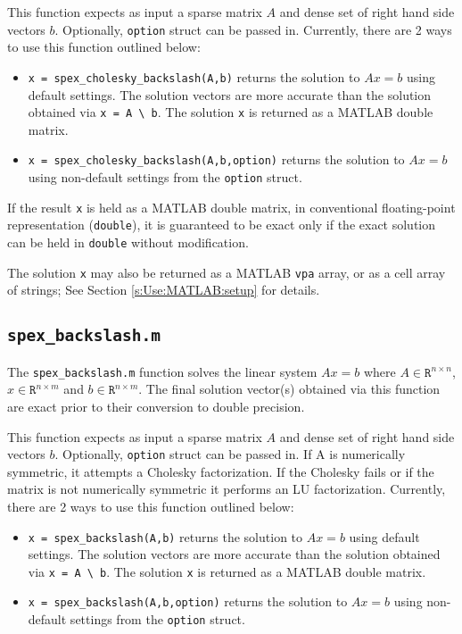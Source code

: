 \documentclass[12pt,oneside]{book}
\theoremstyle{definition}
\begin{document}
This function expects as input a sparse matrix $A$ and dense set of
right hand side vectors $b$. Optionally, \verb|option| struct can be passed in.
Currently, there are 2 ways to use this function outlined below:

\begin{itemize}

\item \verb|x = spex_cholesky_backslash(A,b)| returns the solution to $A x =
b$ using default settings. The solution vectors are more accurate than
the solution obtained via \verb|x = A \ b|.  The solution \verb|x| is
returned as a MATLAB double matrix.

\item \verb|x = spex_cholesky_backslash(A,b,option)| returns the solution to $A x =
b$ using non-default settings from the \verb|option| struct.

\end{itemize}

If the result \verb|x| is held as a MATLAB double matrix, in conventional
floating-point representation (\verb|double|), it is guaranteed to be exact
only if the exact solution can be held in \verb|double| without modification.

The solution \verb|x| may also be returned as a MATLAB \verb|vpa| array, or as
a cell array of strings; See Section \ref{s:Use:MATLAB:setup} for details.


\subsection{\texttt{spex\_backslash.m}}
The \verb|spex_backslash.m| function solves the linear system $A x = b$ where
$A \in \mathtt{R}^{n \times n}$, $x \in \mathtt{R}^{n \times m}$ and $b \in
\mathtt{R}^{n \times m}$. The final solution vector(s) obtained via this
function are exact prior to their conversion to double precision.

This function expects as input a sparse matrix $A$ and dense set of
right hand side vectors $b$. Optionally, \verb|option| struct can be passed in.
If A is numerically symmetric, it attempts a Cholesky factorization. If the Cholesky
fails or if the matrix is not numerically symmetric it performs an LU factorization.
Currently, there are 2 ways to use this function outlined below:

\begin{itemize}

\item \verb|x = spex_backslash(A,b)| returns the solution to $A x =
b$ using default settings. The solution vectors are more accurate than
the solution obtained via \verb|x = A \ b|.  The solution \verb|x| is
returned as a MATLAB double matrix.

\item \verb|x = spex_backslash(A,b,option)| returns the solution to $A x =
b$ using non-default settings from the \verb|option| struct.

\end{itemize}
\end{document}
